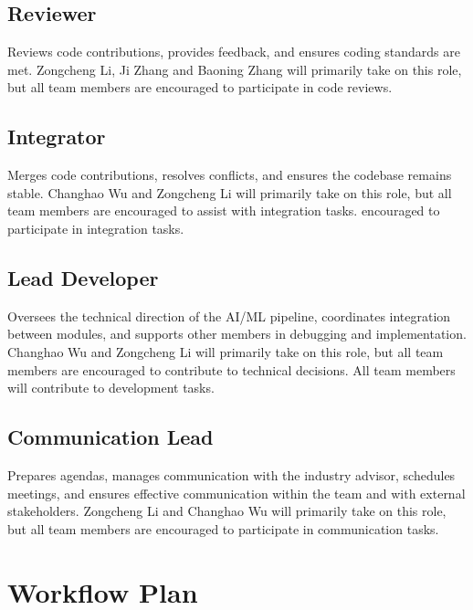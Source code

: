 \documentclass{article}
\begin{document}
\subsection*{Reviewer}
Reviews code contributions, provides feedback, and ensures coding standards are met.
Zongcheng Li, Ji Zhang and Baoning Zhang will primarily take on this role, 
but all team members are encouraged to participate in code reviews.

\subsection*{Integrator}
Merges code contributions, resolves conflicts, and ensures the codebase remains stable.
Changhao Wu and Zongcheng Li will primarily take on this role, 
but all team members are encouraged to assist with integration tasks. encouraged to participate in integration tasks.

\subsection*{Lead Developer}
Oversees the technical direction of the AI/ML pipeline, coordinates integration 
between modules, and supports other members in debugging and implementation.
Changhao Wu and Zongcheng Li will primarily take on this role, 
but all team members are encouraged to contribute to technical decisions.
All team members will contribute to development tasks.

\subsection*{Communication Lead}
Prepares agendas, manages communication with the industry advisor, schedules meetings, and ensures effective communication within the team and with external stakeholders.
Zongcheng Li and Changhao Wu will primarily take on this role, 
but all team members are encouraged to participate in communication tasks.

\section{Workflow Plan}
\end{document}
